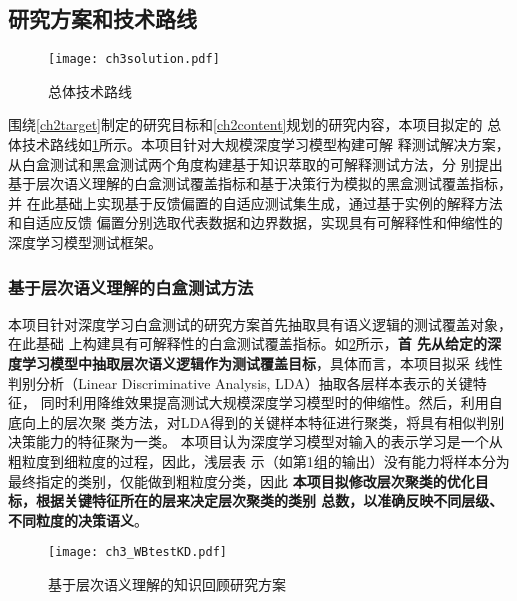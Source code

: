 \subsection{研究方案和技术路线}

\begin{figure}[h]
    \begin{small}
        \begin{center}
            \texttt{[image: ch3solution.pdf]}
        \end{center}
        \caption{总体技术路线}
        \label{fig:ch3:solution}
    \end{small}
\end{figure}

围绕\ref{ch2target}制定的研究目标和\ref{ch2content}规划的研究内容，本项目拟定的
总体技术路线如\cref{fig:ch3:solution}所示。本项目针对大规模深度学习模型构建可解
释测试解决方案，从白盒测试和黑盒测试两个角度构建基于知识萃取的可解释测试方法，分
别提出基于层次语义理解的白盒测试覆盖指标和基于决策行为模拟的黑盒测试覆盖指标，并
在此基础上实现基于反馈偏置的自适应测试集生成，通过基于实例的解释方法和自适应反馈
偏置分别选取代表数据和边界数据，实现具有可解释性和伸缩性的深度学习模型测试框架。

\subsubsection{基于层次语义理解的白盒测试方法}\label{ch3_2}

本项目针对深度学习白盒测试的研究方案首先抽取具有语义逻辑的测试覆盖对象，在此基础
上构建具有可解释性的白盒测试覆盖指标。如\cref{fig:ch3:WBtestKD}所示，\textbf{首
    先从给定的深度学习模型中抽取层次语义逻辑作为测试覆盖目标}，具体而言，本项目拟采
线性判别分析（Linear Discriminative Analysis, LDA）抽取各层样本表示的关键特征，
同时利用降维效果提高测试大规模深度学习模型时的伸缩性。然后，利用自底向上的层次聚
类方法，对LDA得到的关键样本特征进行聚类，将具有相似判别决策能力的特征聚为一类。
本项目认为深度学习模型对输入的表示学习是一个从粗粒度到细粒度的过程，因此，浅层表
示（如第1组的输出）没有能力将样本分为最终指定的类别，仅能做到粗粒度分类，因此
\textbf{本项目拟修改层次聚类的优化目标，根据关键特征所在的层来决定层次聚类的类别
    总数，以准确反映不同层级、不同粒度的决策语义}。

\begin{figure}[htp]
    \begin{small}
        \begin{center}
            \texttt{[image: ch3\_WBtestKD.pdf]}
        \end{center}
        \caption{基于层次语义理解的知识回顾研究方案}
        \label{fig:ch3:WBtestKD}
    \end{small}
\end{figure}

